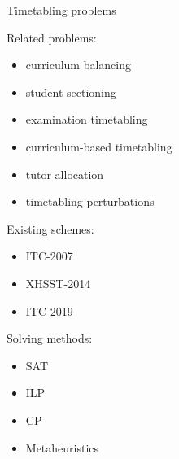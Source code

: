 \documentclass{beamer}
\begin{document}
\begin{frame}{Timetabling problems}
\begin{minipage}{.49\textwidth}
    Related problems:
    \begin{itemize}
        \item curriculum balancing
        \item student sectioning
        \item examination timetabling
        \item curriculum-based timetabling
        \item tutor allocation
        \item timetabling perturbations
    \end{itemize}
\end{minipage}
\hfill
\begin{minipage}{.49\textwidth}
    Existing schemes:
    \begin{itemize}
        \item ITC-2007
        \item XHSST-2014
        \item ITC-2019
    \end{itemize}
    
    \vspace{1em}
    
    Solving methods:
    \begin{itemize}
        \item SAT
        \item ILP
        \item CP
        \item Metaheuristics
    \end{itemize}
\end{minipage}
\end{frame}
\end{document}

